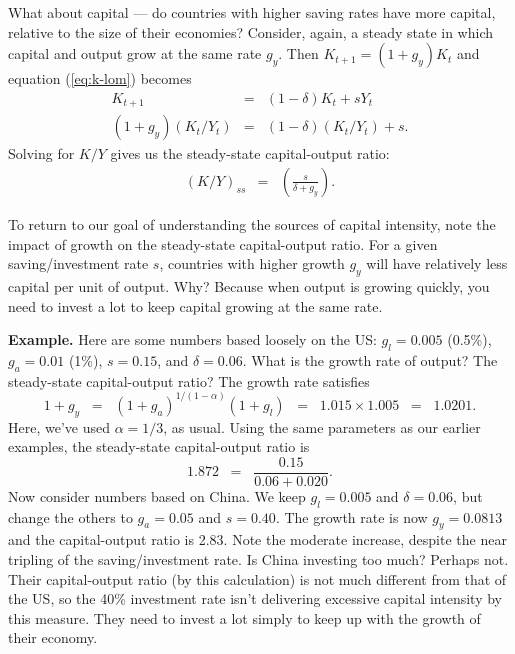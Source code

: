 What about capital --- do countries with higher saving rates have more
capital, relative to the size of their economies?
Consider, again, a steady state in which capital and output grow
at the same rate $g_y$.
Then $K_{t+1} = (1+g_y) K_t$ and equation (\ref{eq:k-lom}) becomes
\begin{eqnarray*}
    K_{t+1}  &=& (1-\delta) K_t + s Y_t  \\
    (1+g_y) (K_{t}/Y_{t}) &=& (1-\delta) (K_t/Y_t) + s .
\end{eqnarray*}
Solving for $K/Y$ gives us the steady-state capital-output ratio:
\begin{eqnarray*}
    (K/Y)_{ss} &=& \left( \frac{s}{\delta+g_y} \right) .
\end{eqnarray*}

To return to our goal of understanding the sources of capital intensity,
note the impact of growth on the steady-state capital-output ratio.
For a given saving/investment rate $s$, countries with higher growth $g_y$
will have relatively less capital per unit of output.
Why?  Because when output is growing quickly,
you need to invest a lot to keep capital growing at the same rate.


\textbf{Example.}
Here are some numbers based loosely on the US:
$ g_l = 0.005 $ (0.5\%), $ g_a = 0.01 $ (1\%), $s=0.15$,
and $\delta = 0.06$.
What is the growth rate of output?
The steady-state capital-output ratio?
The growth rate satisfies
\[
    1+g_y \;\;=\;\; (1+g_a)^{1/(1-\alpha)} (1+g_l) \;\;=\;\; 1.015 \times 1.005
        \;\;=\;\; 1.0201.
\]
Here, we've used $\alpha = 1/3$, as usual.
Using the same parameters as our earlier examples, the steady-state
capital-output ratio is
\[
    1.872 \;\;=\;\; \frac{0.15}{0.06 + 0.020} .
\]
Now consider numbers based on China.
We keep $ g_l = 0.005 $ and $\delta = 0.06$,
but change the others to $ g_a = 0.05 $ and $s = 0.40 $.
The growth rate is now $g_y = 0.0813$ and the capital-output ratio
is 2.83. Note the moderate increase, despite the near tripling of the
saving/investment rate. Is China investing too much?
Perhaps not. Their capital-output ratio (by this calculation)
is not much different from that of the US, so the 40\% investment
rate isn't delivering excessive capital intensity by this measure.
They need to invest a lot simply to keep up with the growth
of their economy.


